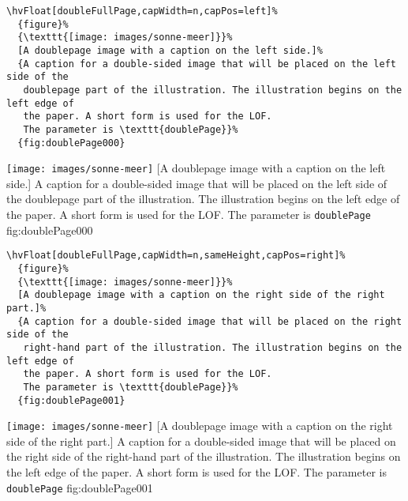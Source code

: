\documentclass[twoside]{scrartcl}
\let\hvBlindtext\Blindtext
\def\Blindtext{\par\color{black!40}\hvBlindtext\par\normalcolor}
\begin{document}
\begin{lstlisting}
\hvFloat[doubleFullPage,capWidth=n,capPos=left]%
  {figure}%
  {\texttt{[image: images/sonne-meer]}}%
  [A doublepage image with a caption on the left side.]%
  {A caption for a double-sided image that will be placed on the left side of the
   doublepage part of the illustration. The illustration begins on the left edge of 
   the paper. A short form is used for the LOF. 
   The parameter is \texttt{doublePage}}%
  {fig:doublePage000}
\end{lstlisting}


%
  {\texttt{[image: images/sonne-meer]}}%
  [A doublepage image with a caption on the left side.]%
  {A caption for a double-sided image that will be placed on the left side of the
   doublepage part of the illustration. The illustration begins on the left edge of 
   the paper. A short form is used for the LOF. 
   The parameter is \texttt{doublePage}}%
  {fig:doublePage000}

\Blindtext

\Blindtext

\Blindtext

\Blindtext

\begin{lstlisting}
\hvFloat[doubleFullPage,capWidth=n,sameHeight,capPos=right]%
  {figure}%
  {\texttt{[image: images/sonne-meer]}}%
  [A doublepage image with a caption on the right side of the right part.]%
  {A caption for a double-sided image that will be placed on the right side of the
   right-hand part of the illustration. The illustration begins on the left edge of 
   the paper. A short form is used for the LOF. 
   The parameter is \texttt{doublePage}}%
  {fig:doublePage001}
\end{lstlisting}


%
  {\texttt{[image: images/sonne-meer]}}%
  [A doublepage image with a caption on the right side of the right part.]%
  {A caption for a double-sided image that will be placed on the right side of the
   right-hand part of the illustration. The illustration begins on the left edge of 
   the paper. A short form is used for the LOF. 
   The parameter is \texttt{doublePage}}%
  {fig:doublePage001}

\Blindtext
\end{document}
